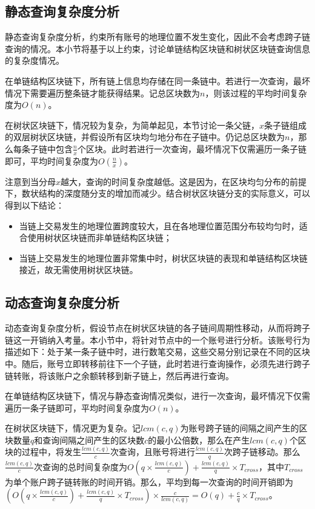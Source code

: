 \subsection{静态查询复杂度分析}

静态查询复杂度分析，约束所有账号的地理位置不发生变化，因此不会考虑跨子链查询的情况。本小节将基于以上约束，讨论单链结构区块链和树状区块链查询信息的复杂度情况。

在单链结构区块链下，所有链上信息均存储在同一条链中。若进行一次查询，最坏情况下需要遍历整条链才能获得结果。记总区块数为$n$，则该过程的平均时间复杂度为$O(n)$。

在树状区块链下，情况较为复杂，为简单起见，本节讨论一条父链，$x$条子链组成的双层树状区块链，并假设所有区块均匀地分布在子链中。仍记总区块数为$n$，那么每条子链中包含$\frac{n}{x}$个区块。此时若进行一次查询，最坏情况下仅需遍历一条子链即可，平均时间复杂度为$O(\frac{n}{x})$。

注意到当分母$x$越大，查询的时间复杂度越低。这是因为，在区块均匀分布的前提下，数状结构的深度随分支的增加而减少。结合树状区块链分支的实际意义，可以得到以下结论：

\begin{itemize}
    \item 当链上交易发生的地理位置跨度较大，且在各地理位置范围分布较均匀时，适合使用树状区块链而非单链结构区块链；
    \item 当链上交易发生的地理位置非常集中时，树状区块链的表现和单链结构区块链接近，故无需使用树状区块链。
\end{itemize}

\subsection{动态查询复杂度分析}

动态查询复杂度分析，假设节点在树状区块链的各子链间周期性移动，从而将跨子链这一开销纳入考量。本小节中，将针对节点中的一个账号进行分析。该账号行为描述如下：处于某一条子链中时，进行数笔交易，这些交易分别记录在不同的区块中。随后，账号立即转移前往下一个子链，此时若进行查询操作，必须先进行跨子链转账，将该账户之余额转移到新子链上，然后再进行查询。

在单链结构区块链下，情况与静态查询情况类似，进行一次查询，最坏情况下仅需遍历一条子链即可，平均时间复杂度为$O(n)$。

在树状区块链下，情况更为复杂。记$lcm(c, q)$为账号跨子链的间隔之间产生的区块数量$q$和查询间隔之间产生的区块数$c$的最小公倍数，那么在产生$lcm(c, q)$个区块的过程中，将发生$\frac{lcm(c, q)}{c}$次查询，且账号将进行$\frac{lcm(c, q)}{q}$次跨子链移动。那么$\frac{lcm(c, q)}{c}$次查询的总时间复杂度为$O(q \times \frac{lcm(c, q)}{c}) + \frac{lcm(c, q)}{q} \times T_{cross}$，其中$T_{cross}$为单个账户跨子链转账的时间开销。那么，平均到每一次查询的时间开销即为$(O(q \times \frac{lcm(c, q)}{c}) + \frac{lcm(c, q)}{q} \times T_{cross}) \times \frac{c}{lcm(c, q)} = O(q) + \frac{c}{q} \times T_{cross}$。


